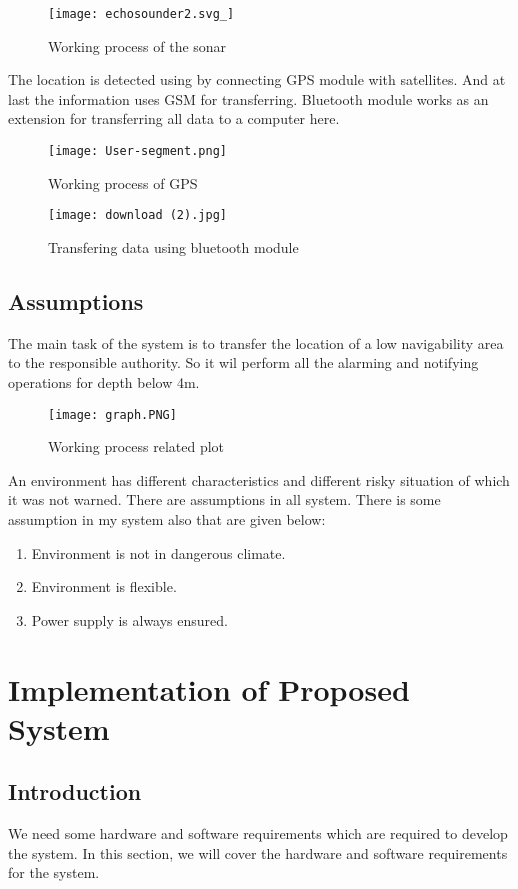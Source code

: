 \documentclass[12pt, top = 1 inch, bottom = 1 inch, left = 1.2 inch, top = .8 inch]{book}
\begin{document}
			\begin{figure}[h!]	
				\centering
				\texttt{[image: echosounder2.svg\_]}
				\caption{Working process of the sonar}
				\label{fig:echosounder2}
			\end{figure}
			The location is detected using by connecting GPS module with satellites. And at last the information uses GSM for transferring. Bluetooth module works as an extension for transferring all data to a computer here.  
			\begin{figure}[h!]	
				\centering
				\texttt{[image: User-segment.png]}
				\caption{Working process of GPS}
				\label{fig:echosounder2}
			\end{figure} 
			\begin{figure}[h!]	
				\centering
				\texttt{[image: download (2).jpg]}
				\caption{Transfering data using bluetooth module}
			\end{figure}
			\section{Assumptions} 
			The main task of the system is to transfer the location of a low navigability area to the responsible authority. So it wil perform all the alarming and notifying operations for depth below 4m.
			\begin{figure}[h!]	
				\centering
				\texttt{[image: graph.PNG]}
				\caption{Working process related plot}
			\end{figure} 
			An environment has different characteristics and different risky situation of which it was not warned. There are assumptions in all system. There is some assumption in my system also that are given below:
			\begin{enumerate}
				\item Environment is not in dangerous climate.
				\item Environment is flexible.
				\item Power supply is always ensured.
			\end{enumerate}
			\chapter{Implementation of Proposed System}
			\section{Introduction}
			We need some hardware and software requirements which are required to develop the system. In this section, we will cover the hardware and software requirements for the system.
\end{document}

